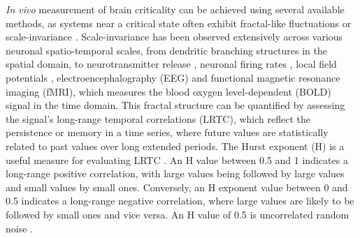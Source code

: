 \documentclass[
true
]{sn-jnl}
\begin{document}
\emph{In vivo} measurement of brain criticality can be achieved using
several available methods, as systems near a critical state often
exhibit fractal-like fluctuations or scale-invariance
\citep{munozColloquiumCriticalityDynamical2018}. Scale-invariance has
been observed extensively across various neuronal spatio-temporal
scales, from dendritic branching structures
\citep{casertaDeterminationFractalDimension1995} in the spatial domain,
to neurotransmitter release
\citep{lowenQuantalNeurotransmitterSecretion1997}, neuronal firing rates
\citep{mazzoniDynamicsSpontaneousActivity2007}, local field potentials
\citep{bedardMacroscopicModelsLocal2009}, electroencephalography (EEG)
\citep{bullmoreFractalAnalysisElectroencephalographic1994} and
functional magnetic resonance imaging (fMRI), which measures the blood
oxygen level-dependent (BOLD) signal
\citep{zarahnEmpiricalAnalysesBOLD1997, fadiliWaveletGeneralizedLeastSquares2002, campbellMonofractalAnalysisFunctional2022}
in the time domain. This fractal structure can be quantified by
assessing the signal's long-range temporal correlations (LRTC), which
reflect the persistence or memory in a time series, where future values
are statistically related to past values over long extended periods. The
Hurst exponent (H) is a useful measure for evaluating LRTC
\citep{ekeFractalCharacterizationComplexity2002, campbellMonofractalAnalysisFunctional2022}.
An H value between 0.5 and 1 indicates a long-range positive
correlation, with large values being followed by large values and small
values by small ones. Conversely, an H exponent value between 0 and 0.5
indicates a long-range negative correlation, where large values are
likely to be followed by small ones and vice versa. An H value of 0.5 is
uncorrelated random noise \citep{hurstLongTermStorageCapacity1951}.
\end{document}

